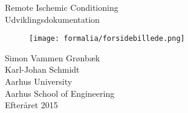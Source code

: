 \thispagestyle{empty} %


\colorbox{usDef}{
	\parbox[t]{1.0\linewidth}{
		\centering \fontsize{30pt}{50pt}\selectfont %
		\vspace*{0.7cm} %
		
		\hfill Remote Ischemic Conditioning\\
		\hfill Udviklingsdokumentation \\
		
		\vspace*{0.7cm} %
	}
}

\vfill %

\begin{figure}[H]
	\texttt{[image: formalia/forsidebillede.png]}
\end{figure}





{\centering \large 
	\hfill Simon Vammen Grønbæk \\
	\hfill Karl-Johan Schmidt\\
	\hfill Aarhus University \\
	\hfill Aarhus School of Engineering\\
	\hfill Efteråret 2015 \\
}

\clearpage %